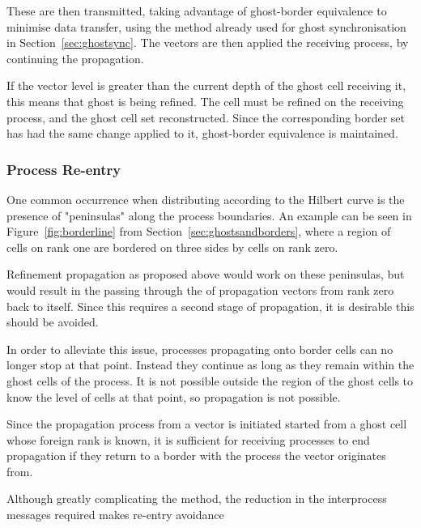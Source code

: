 \documentclass[twoside]{IIBproject}
\numberwithin{figure}{section}
\begin{document}
        These are then transmitted, taking advantage of ghost-border equivalence to minimise data transfer, using the method already used for ghost synchronisation in Section~\ref{sec:ghostsync}. The vectors are then applied the receiving process, by continuing the propagation. 

        If the vector level is greater than the current depth of the ghost cell receiving it, this means that ghost is being refined. The cell must be refined on the receiving process, and the ghost cell set reconstructed. Since the corresponding border set has had the same change applied to it, ghost-border equivalence is maintained. 


        \subsubsection{Process Re-entry} %
            \label{sec:parprop-reentry}

            One common occurrence when distributing according to the Hilbert curve is the presence of "peninsulas" along the process boundaries. An example can be seen in Figure~\ref{fig:borderline} from Section~\ref{sec:ghostsandborders}, where a region of cells on rank one are bordered on three sides by cells on rank zero. 

            Refinement propagation as proposed above would work on these peninsulas, but would result in the passing through the of propagation vectors from rank zero back to itself. Since this requires a second stage of propagation, it is desirable this should be avoided.

            In order to alleviate this issue, processes propagating onto border cells can no longer stop at that point. Instead they continue as long as they remain within the ghost cells of the process. It is not possible outside the region of the ghost cells to know the level of cells at that point, so propagation is not possible. 

            Since the propagation process from a vector is initiated started from a ghost cell whose foreign rank is known, it is sufficient for receiving processes to end propagation if they return to a border with the process the vector originates from. 

            Although greatly complicating the method, the reduction in the interprocess messages required makes re-entry avoidance 

\end{document}
